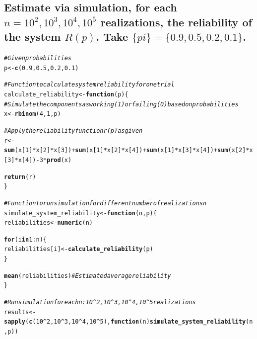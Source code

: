 \documentclass[12pt]{article}\usepackage[]{graphicx}\usepackage[]{xcolor}
\makeatletter
\newcommand{\hlnum}[1]{\textcolor[rgb]{0.686,0.059,0.569}{#1}}%
\newcommand{\hlcom}[1]{\textcolor[rgb]{0.678,0.584,0.686}{\textit{#1}}}%
\newcommand{\hlopt}[1]{\textcolor[rgb]{0,0,0}{#1}}%
\newcommand{\hldef}[1]{\textcolor[rgb]{0.345,0.345,0.345}{#1}}%
\newcommand{\hlkwa}[1]{\textcolor[rgb]{0.161,0.373,0.58}{\textbf{#1}}}%
\newcommand{\hlkwb}[1]{\textcolor[rgb]{0.69,0.353,0.396}{#1}}%
\newcommand{\hlkwc}[1]{\textcolor[rgb]{0.333,0.667,0.333}{#1}}%
\newcommand{\hlkwd}[1]{\textcolor[rgb]{0.737,0.353,0.396}{\textbf{#1}}}%
\newenvironment{kframe}{%
 \def\at@end@of@kframe{}%
 \ifinner\ifhmode%
  \def\at@end@of@kframe{\end{minipage}}%
  \begin{minipage}{\columnwidth}%
 \fi\fi%
 \def\FrameCommand##1{\hskip\@totalleftmargin \hskip-\fboxsep
 \colorbox{shadecolor}{##1}\hskip-\fboxsep
     \hskip-\linewidth \hskip-\@totalleftmargin \hskip\columnwidth}%
 \MakeFramed {\advance\hsize-\width
   \@totalleftmargin\z@ \linewidth\hsize
   \@setminipage}}%
 {\par\unskip\endMakeFramed%
 \at@end@of@kframe}
\newenvironment{knitrout}{}{} %
\makeatother
\begin{document}
\subsection{Estimate via simulation, for each $n = 10^{2} , 10^{3} , 10^{4} , 10^{5}$ realizations, the reliability of the system $R(p)$. Take $\{pi \} = \{0.9, 0.5, 0.2, 0.1\}$.}
\begin{knitrout}
\color{fgcolor}\begin{kframe}
\begin{alltt}
\hlcom{# Given probabilities}
\hldef{p} \hlkwb{<-} \hlkwd{c}\hldef{(}\hlnum{0.9}\hldef{,} \hlnum{0.5}\hldef{,} \hlnum{0.2}\hldef{,} \hlnum{0.1}\hldef{)}

\hlcom{# Function to calculate system reliability for one trial}
\hldef{calculate_reliability} \hlkwb{<-} \hlkwa{function}\hldef{(}\hlkwc{p}\hldef{) \{}
  \hlcom{# Simulate the components as working (1) or failing (0) based on probabilities}
  \hldef{x} \hlkwb{<-} \hlkwd{rbinom}\hldef{(}\hlnum{4}\hldef{,} \hlnum{1}\hldef{, p)}

  \hlcom{# Apply the reliability function r(p) as given}
  \hldef{r} \hlkwb{<-} \hlkwd{sum}\hldef{(x[}\hlnum{1}\hldef{]}\hlopt{*}\hldef{x[}\hlnum{2}\hldef{]}\hlopt{*}\hldef{x[}\hlnum{3}\hldef{])} \hlopt{+} \hlkwd{sum}\hldef{(x[}\hlnum{1}\hldef{]}\hlopt{*}\hldef{x[}\hlnum{2}\hldef{]}\hlopt{*}\hldef{x[}\hlnum{4}\hldef{])} \hlopt{+} \hlkwd{sum}\hldef{(x[}\hlnum{1}\hldef{]}\hlopt{*}\hldef{x[}\hlnum{3}\hldef{]}\hlopt{*}\hldef{x[}\hlnum{4}\hldef{])} \hlopt{+} \hlkwd{sum}\hldef{(x[}\hlnum{2}\hldef{]}\hlopt{*}\hldef{x[}\hlnum{3}\hldef{]}\hlopt{*}\hldef{x[}\hlnum{4}\hldef{])} \hlopt{-} \hlnum{3} \hlopt{*} \hlkwd{prod}\hldef{(x)}

  \hlkwd{return}\hldef{(r)}
\hldef{\}}

\hlcom{# Function to run simulation for different number of realizations n}
\hldef{simulate_system_reliability} \hlkwb{<-} \hlkwa{function}\hldef{(}\hlkwc{n}\hldef{,} \hlkwc{p}\hldef{) \{}
  \hldef{reliabilities} \hlkwb{<-} \hlkwd{numeric}\hldef{(n)}

  \hlkwa{for} \hldef{(i} \hlkwa{in} \hlnum{1}\hlopt{:}\hldef{n) \{}
    \hldef{reliabilities[i]} \hlkwb{<-} \hlkwd{calculate_reliability}\hldef{(p)}
  \hldef{\}}

  \hlkwd{mean}\hldef{(reliabilities)}  \hlcom{# Estimated average reliability}
\hldef{\}}

\hlcom{# Run simulation for each n: 10^2, 10^3, 10^4, 10^5 realizations}
\hldef{results} \hlkwb{<-} \hlkwd{sapply}\hldef{(}\hlkwd{c}\hldef{(}\hlnum{10}\hlopt{^}\hlnum{2}\hldef{,} \hlnum{10}\hlopt{^}\hlnum{3}\hldef{,} \hlnum{10}\hlopt{^}\hlnum{4}\hldef{,} \hlnum{10}\hlopt{^}\hlnum{5}\hldef{),} \hlkwa{function}\hldef{(}\hlkwc{n}\hldef{)} \hlkwd{simulate_system_reliability}\hldef{(n, p))}


\end{alltt}
\end{kframe}
\end{knitrout}
\end{document}
